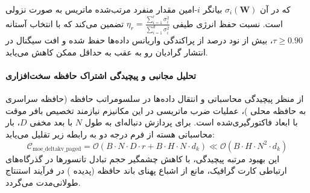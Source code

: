 که در آن $\sigma_i(\mathbf{W})$ بیانگر $i$-امین مقدار منفرد مرتب‌شده ماتریس به صورت نزولی است. نسبت حفظ انرژی طیفی $\eta_r = \frac{\sum_{i=1}^r \sigma_i^2}{\sum_{i=1}^{d} \sigma_i^2}$ تضمین می‌کند که با انتخاب آستانه $\tau \ge 0.90$، بیش از نود درصد از پراکندگی واریانس داده‌ها حفظ شده و افت سیگنال در انتشار گرادیان رو به عقب به حداقل ممکن کاهش می‌یابد.

\paragraph{تحلیل مجانبی و پیچیدگی اشتراک حافظه سخت‌افزاری}
از منظر پیچیدگی محاسباتی و انتقال داده‌ها در سلسومراتب حافظه (حافظه سراسری  به حافظه محلی )، عملیات ضرب ماتریسی در این مکانیزم نیازمند تخصیص بافر موقت با ابعاد فاکتورگیری‌شده است. برای پردازش دنباله‌ای به طول $N$ با بعد مخفی $D$، بار محاسباتی هسته از فرم درجه دو به رابطه زیر تقلیل می‌یابد:
\begin{equation}
\label{eq:complexity_moe_deltakv_paged}
\mathcal{C}_{\text{moe\_deltakv\_paged}} = \mathcal{O}\left( B \cdot N \cdot D \cdot r + B \cdot H \cdot N \cdot d_k \right) \ll \mathcal{O}\left( B \cdot H \cdot N^2 \cdot d_k \right)
\end{equation}
این بهبود مرتبه پیچیدگی، با کاهش چشمگیر حجم تبادل تانسورها در گذرگاه‌های ارتباطی کارت گرافیک، مانع از اشباع پهنای باند حافظه (پدیده ) در فرآیند استنتاج طولانی‌مدت می‌گردد.